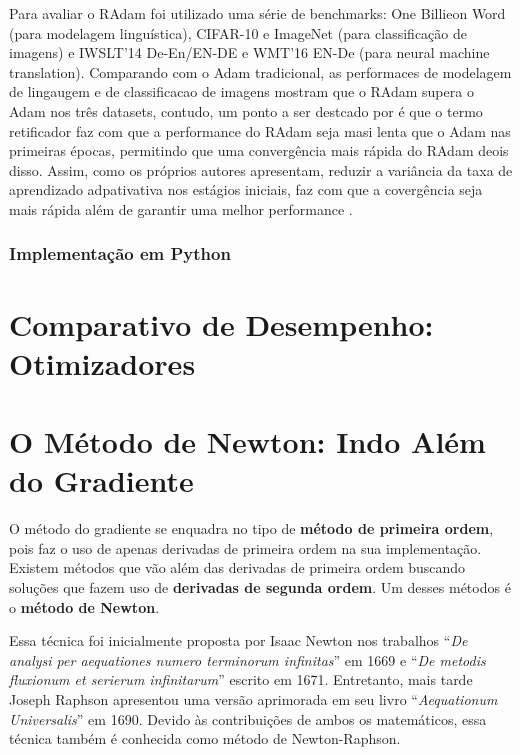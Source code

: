 Para avaliar o RAdam foi utilizado uma série de benchmarks: One Billieon Word (para modelagem linguística), CIFAR-10 e ImageNet (para classificação de imagens) e IWSLT’14 De-En/EN-DE e WMT’16 EN-De  (para neural machine translation). Comparando com o Adam tradicional, as performaces de modelagem de lingaugem e de classificacao de imagens mostram que o RAdam supera o Adam nos três datasets, contudo, um ponto a ser destcado por \textcite{RAdamMethod} é que o termo retificador faz com que a performance do RAdam seja masi lenta que o Adam nas primeiras épocas, permitindo que uma convergência mais rápida do RAdam deois disso. Assim, como os próprios autores apresentam, reduzir a variância da taxa de aprendizado adpativativa nos estágios iniciais, faz com que a covergência seja mais rápida além de garantir uma melhor performance \parencite{RAdamMethod}.

\subsubsection{Implementação em Python}

\section{Comparativo de Desempenho: Otimizadores}


\section{O Método de Newton: Indo Além do Gradiente}

O método do gradiente se enquadra no tipo de \textbf{método de primeira ordem}, pois faz o uso de apenas derivadas de primeira ordem na sua implementação. Existem métodos que vão além das derivadas de primeira ordem buscando soluções que fazem uso de \textbf{derivadas de segunda ordem}. Um desses métodos é o \textbf{método de Newton}.

Essa técnica foi inicialmente proposta por Isaac Newton nos trabalhos “\textit{De analysi per aequationes numero terminorum infinitas}” em 1669 e “\textit{De metodis fluxionum et serierum infinitarum}” escrito em 1671. Entretanto, mais tarde Joseph Raphson apresentou uma versão aprimorada em seu livro “\textit{Aequationum Universalis}” em 1690. Devido às contribuições de ambos os matemáticos, essa técnica também é conhecida como método de Newton-Raphson.

